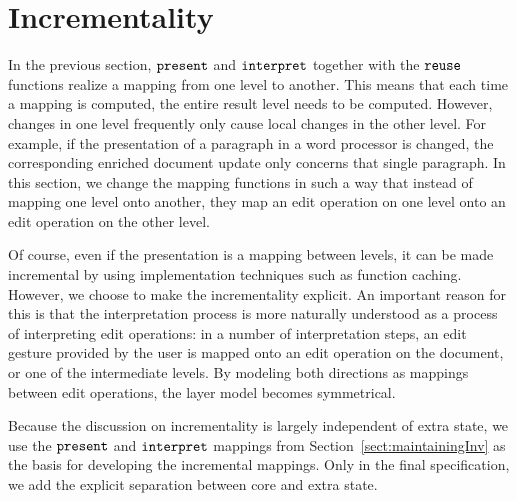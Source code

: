 



%																
\section{Incrementality} \label{sect:maintainingInc}

In the previous section, ${\tt present}$ and ${\tt interpret}$ together with the ${\tt reuse}$ functions realize a mapping from one level to another. This means that each time a mapping is computed, the entire result level needs to be computed. However, changes in one level frequently only cause local changes in the other level. For example, if the presentation of a paragraph in a word processor is changed, the corresponding enriched document update only concerns that single paragraph. In this section, we change the mapping functions in such a way that instead of mapping one level onto another, they map an edit operation on one level onto an edit operation on the other level. 

Of course, even if the presentation is a mapping between levels, it can be made incremental by using implementation techniques such as function caching. However, we choose to make the incrementality explicit. An important reason for this is that the interpretation process is more naturally understood as a process of interpreting edit operations: in a number of interpretation steps, an edit gesture provided by the user is mapped onto an edit operation on the document, or one of the intermediate levels. By modeling both directions as mappings between edit operations, the layer model becomes symmetrical. 

Because the discussion on incrementality is largely independent of extra state, we use the ${\tt present}$ and ${\tt interpret}$ mappings from Section~\ref{sect:maintainingInv} as the basis for developing the incremental mappings. Only in the final specification, we add the explicit separation between core and extra state.



